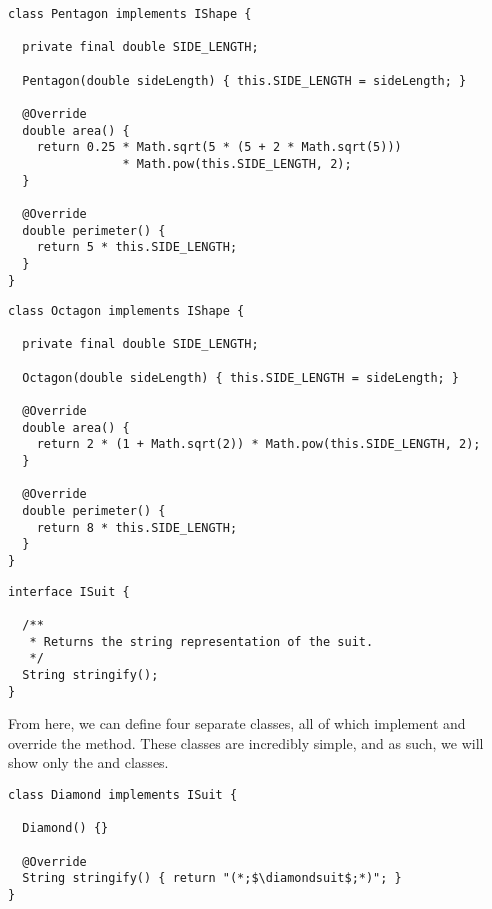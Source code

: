 \begin{lstlisting}[language=MyJava]
class Pentagon implements IShape {
  
  private final double SIDE_LENGTH;

  Pentagon(double sideLength) { this.SIDE_LENGTH = sideLength; }

  @Override
  double area() {
    return 0.25 * Math.sqrt(5 * (5 + 2 * Math.sqrt(5))) 
                * Math.pow(this.SIDE_LENGTH, 2);
  }

  @Override
  double perimeter() {
    return 5 * this.SIDE_LENGTH;
  }
}
\end{lstlisting}

\begin{lstlisting}[language=MyJava]
class Octagon implements IShape {

  private final double SIDE_LENGTH;

  Octagon(double sideLength) { this.SIDE_LENGTH = sideLength; }

  @Override
  double area() {
    return 2 * (1 + Math.sqrt(2)) * Math.pow(this.SIDE_LENGTH, 2);
  }

  @Override
  double perimeter() {
    return 8 * this.SIDE_LENGTH;
  }
}
\end{lstlisting}


\begin{lstlisting}[language=MyJava]
interface ISuit {

  /**
   * Returns the string representation of the suit.
   */
  String stringify();
}
\end{lstlisting}

From here, we can define four separate classes, all of which implement  and override the  method. These classes are incredibly simple, and as such, we will show only the  and  classes.

\begin{lstlisting}[language=MyJava]
class Diamond implements ISuit {
  
  Diamond() {}

  @Override
  String stringify() { return "(*;$\diamondsuit$;*)"; }
}
\end{lstlisting}

